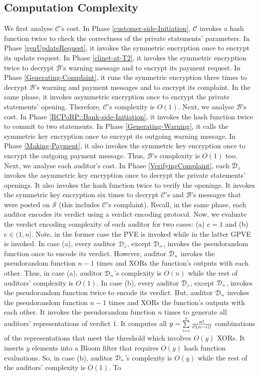 \subsection{Computation Complexity}  We first analyse $\mathcal{C}$'s cost. In Phase \ref{customer-side-Initiation}, $\mathcal{C}$ invokes a hash function twice to check the correctness of the private statements' parameters. In Phase \ref{genUpdateRequest}, it invokes the symmetric encryption once to encrypt its update request. In Phase \ref{clinet-at-T2}, it invokes the symmetric encryption twice to decrypt $\mathcal{B}$'s warning message and to encrypt its payment request. In Phase \ref{Generating-Complaint}, it runs the symmetric encryption three times to decrypt $\mathcal{B}$'s warning and payment messages and to encrypt its complaint. In the same phase, it invokes asymmetric encryption once to encrypt the private statements' opening. Therefore, $\mathcal{C}$'s complexity   is  $O(1)$. Next, we analyse $\mathcal{B}$'s cost. In Phase \ref{RCPoRP::Bank-side-Initiation}, it invokes the hash function twice to commit to two statements. In Phase \ref{Generating-Warning}, it calls the symmetric key encryption once to encrypt its outgoing warning message. In Phase \ref{Making-Payment}, it also invokes the symmetric key encryption once to encrypt the outgoing payment message. Thus, $\mathcal{B}$'s complexity is  $O(1)$ too. Next, we analyse each auditor's cost. In Phase \ref{VerifyingComplaint}, each $\mathcal{D}_{\scriptscriptstyle j}$ invokes the asymmetric key encryption once to decrypt the private statements' openings. It also invokes the hash function twice to verify the openings. It invokes the symmetric key encryption six times to decrypt $\mathcal{C}$'s and $\mathcal{B}$'s messages that were posted on $\mathcal{S}$ (this includes $\mathcal{C}$'s complaint). Recall, in the same phase, each auditor encodes its verdict using a verdict encoding protocol. Now, we evaluate the verdict encoding complexity of each auditor for two cases: (a)   $e=1$ and (b) $e\in(1, n]$. Note, in the former case the PVE is invoked while in the latter GPVE is invoked. In case (a), every auditor $\mathcal{D}_{\scriptscriptstyle j}$, except $\mathcal{D}_{\scriptscriptstyle n}$, invokes the pseudorandom function once to encode its verdict. However,  auditor $\mathcal{D}_{\scriptscriptstyle n}$ invokes the pseudorandom function $n-1$ times and XORs the function's outputs with each other. Thus, in  case (a), auditor $\mathcal{D}_{\scriptscriptstyle n}$'s complexity is $O(n)$ while the rest of auditors' complexity is $O(1)$.  In case (b), every auditor $\mathcal{D}_{\scriptscriptstyle j}$, except $\mathcal{D}_{\scriptscriptstyle n}$, invokes the pseudorandom function twice to encode its verdict.  But,  auditor $\mathcal{D}_{\scriptscriptstyle n}$ invokes the pseudorandom function $n-1$ times and XORs the function's outputs with each other. It invokes the pseudorandom function $n$ times to generate all auditors' representations of verdict $1$. It computes all $y=\sum\limits_{\scriptscriptstyle i=e}^{\scriptscriptstyle n}\frac{n!}{i!(n- i)!}$ combinations of the representations that meet the threshold which involves $O(y)$ XORs. It inserts $y$ elements into a Bloom filter that requires  $O(y)$ hash function evaluations. So, in case (b), auditor $\mathcal{D}_{\scriptscriptstyle n}$'s complexity is $O(y)$ while the rest of the auditors' complexity is $O(1)$. To 